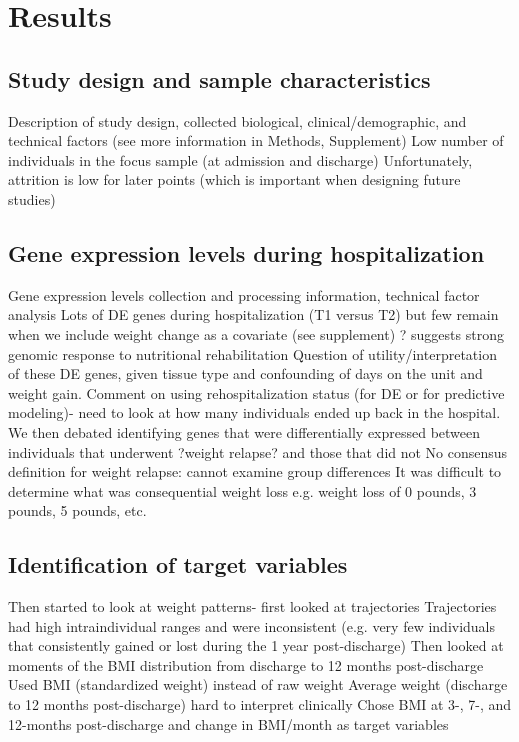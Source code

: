 \section{Results}\label{ch04-results}

\subsection{Study design and sample characteristics}\label{study-design-and-quality-control}

Description of study design, collected biological, clinical/demographic, and technical factors (see more information in Methods, Supplement)
Low number of individuals in the focus sample (at admission and discharge)
Unfortunately, attrition is low for later points (which is important when designing future studies)

\subsection{Gene expression levels during hospitalization}\label{batch-effects-associated-with-umi-based-single-cell-data}


Gene expression levels collection and processing information, technical factor analysis
Lots of DE genes during hospitalization (T1 versus T2) but few remain when we include weight change as a covariate (see supplement) ? suggests strong genomic response to nutritional rehabilitation
Question of utility/interpretation of these DE genes, given tissue type and confounding of days on the unit and weight gain. 
Comment on using rehospitalization status (for DE or for predictive modeling)- need to look at how many individuals ended up back in the hospital.
We then debated identifying genes that were differentially expressed between individuals that underwent ?weight relapse? and those that did not
No consensus definition for weight relapse: cannot examine group differences
It was difficult to determine what was consequential weight loss e.g. weight loss of 0 pounds, 3 pounds, 5 pounds, etc. 

\subsection{Identification of target variables}\label{measuring-regulatory-noise-in-single-cell-gene-expression-data}

Then started to look at weight patterns- first looked at trajectories
Trajectories had high intraindividual ranges and were inconsistent (e.g. very few individuals that consistently gained or lost during the 1 year post-discharge)
Then looked at moments of the BMI distribution from discharge to 12 months post-discharge
Used BMI (standardized weight) instead of raw weight
Average weight (discharge to 12 months post-discharge) hard to interpret clinically
Chose BMI at 3-, 7-, and 12-months post-discharge and change in BMI/month as target variables

